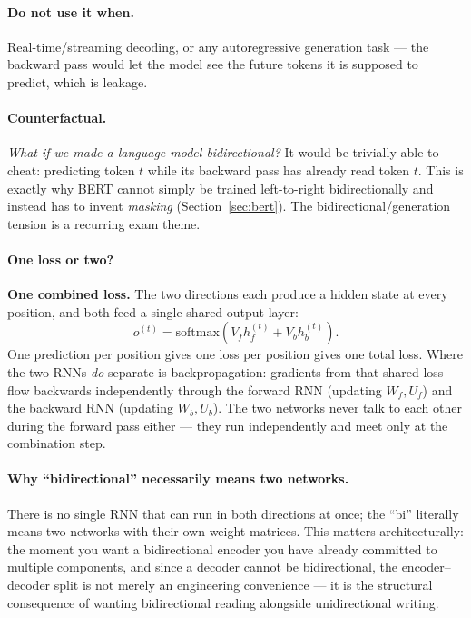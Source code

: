 \documentclass[11pt,a4paper]{article}
\begin{document}
\paragraph{Do not use it when.} Real-time/streaming decoding, or any autoregressive
generation task --- the backward pass would let the model see the future tokens it is
supposed to predict, which is leakage.

\paragraph{Counterfactual.} \emph{What if we made a language model bidirectional?}
It would be trivially able to cheat: predicting token $t$ while its backward pass has
already read token $t$. This is exactly why BERT cannot simply be trained left-to-right
bidirectionally and instead has to invent \emph{masking} (Section~\ref{sec:bert}). The
bidirectional/generation tension is a recurring exam theme.

\paragraph{One loss or two?} \textbf{One combined loss.} The two directions each produce a
hidden state at every position, and both feed a single shared output layer:
\[
o^{(t)} = \mathrm{softmax}\!\left(V_f h_f^{(t)} + V_b h_b^{(t)}\right).
\]
One prediction per position gives one loss per position gives one total loss. Where the two
RNNs \emph{do} separate is backpropagation: gradients from that shared loss flow backwards
independently through the forward RNN (updating $W_f, U_f$) and the backward RNN (updating
$W_b, U_b$). The two networks never talk to each other during the forward pass either --- they
run independently and meet only at the combination step.

\paragraph{Why ``bidirectional'' necessarily means two networks.} There is no single RNN that
can run in both directions at once; the ``bi'' literally means two networks with their own
weight matrices. This matters architecturally: the moment you want a bidirectional encoder you
have already committed to multiple components, and since a decoder cannot be bidirectional,
the encoder--decoder split is not merely an engineering convenience --- it is the structural
consequence of wanting bidirectional reading alongside unidirectional writing.
\end{document}
